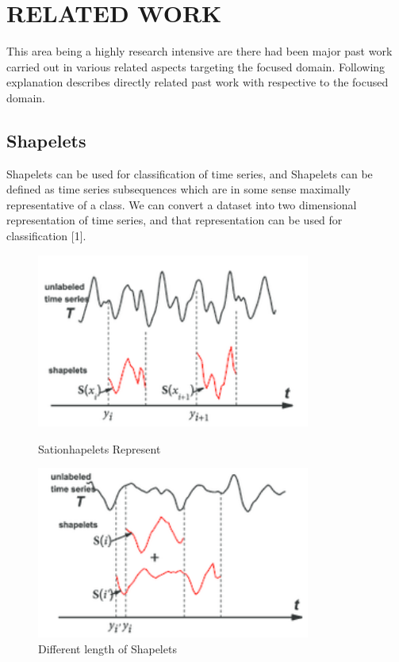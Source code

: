\documentclass[letterpaper, 10 pt, conference]{IEEEtran}  %
\begin{document}
\section{RELATED WORK}

This area being a highly research intensive are there had been major past work carried out in various related aspects targeting the focused domain. Following explanation describes directly related past work with respective to the focused domain.

\subsection{Shapelets}

Shapelets can be used for classification of time series, and Shapelets can be defined as time series subsequences which are in some sense maximally representative of a class. We can convert a dataset into two dimensional representation of time series, and that representation can be used for classification [1].  

\begin{figure}
\centering
\parbox{9cm}{
\includegraphics[width=9cm]{shapelet1.png}
\caption{Sationhapelets Represent}
\label{fig:2figsA}}
\qquad
\begin{minipage}{9cm}
\includegraphics[width=9cm]{shapelet2.png}
\caption{Different length of Shapelets}
\label{fig:2figsB}
\end{minipage}
\end{figure}
\end{document}
